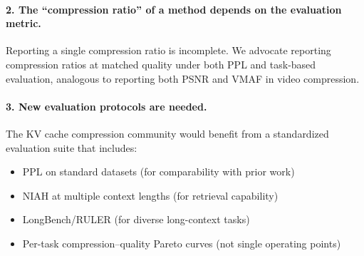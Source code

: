 \paragraph{2. The ``compression ratio'' of a method depends on the evaluation metric.}
Reporting a single compression ratio is incomplete. We advocate reporting compression ratios at matched quality under both PPL and task-based evaluation, analogous to reporting both PSNR and VMAF in video compression.

\paragraph{3. New evaluation protocols are needed.}
The KV cache compression community would benefit from a standardized evaluation suite that includes:
\begin{itemize}
    \item PPL on standard datasets (for comparability with prior work)
    \item NIAH at multiple context lengths (for retrieval capability)
    \item LongBench/RULER (for diverse long-context tasks)
    \item Per-task compression--quality Pareto curves (not single operating points)
\end{itemize}
